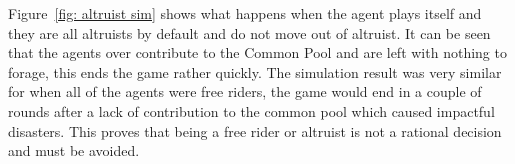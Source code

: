 Figure~\ref{fig: altruist sim}  shows what happens when the agent plays itself and they are all altruists by default and do not move out of altruist. It can be seen that the agents over contribute to the Common Pool and are left with nothing to forage, this ends the game rather quickly. The simulation result was very similar for when all of the agents were free riders, the game would end in a couple of rounds after a lack of contribution to the common pool which caused impactful disasters.  This proves that being a free rider or altruist is not a rational decision and must be avoided. 

